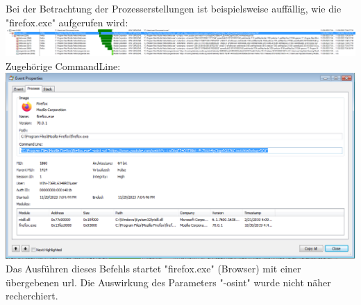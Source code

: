 \documentclass{article}
\begin{document}
	\pagebreak
	
	\noindent Bei der Betrachtung der Prozesserstellungen ist beispielsweise auffällig, wie die "firefox.exe" aufgerufen wird:\\
	\includegraphics[width=1\linewidth]{"pictures/2.1 process creation"}\\
	Zugehörige CommandLine:\\
	\includegraphics[width=1\linewidth]{"pictures/2.1 firefox start"}\\
	Das Ausführen dieses Befehls startet "firefox.exe" (Browser) mit einer übergebenen url. Die Auswirkung des Parameters "-osint" wurde nicht näher recherchiert.
	
	\pagebreak
	
\end{document}
